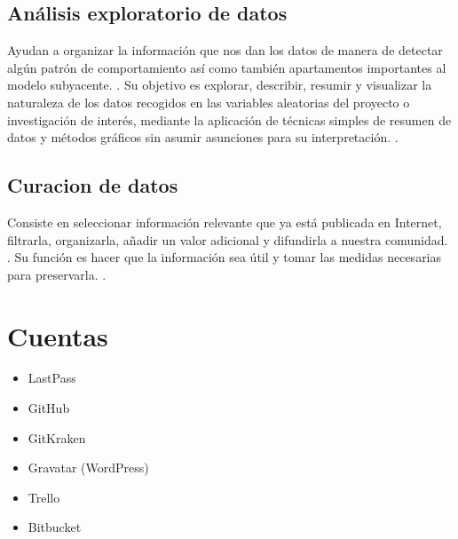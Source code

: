 \documentclass[12pt,letterpaper]{article}
\begin{document}
\subsection*{An\'alisis exploratorio de datos}
Ayudan a organizar la informaci\'on que nos dan los datos de manera de detectar alg\'un patr\'on de comportamiento as\'i como tambi\'en apartamentos importantes al modelo subyacente.
\cite[(Orellana, L. s.f.)]{ref12}.
Su objetivo es explorar, describir, resumir y visualizar la naturaleza de los datos recogidos en las variables aleatorias del proyecto o investigaci\'on de inter\'es, mediante la aplicaci\'on de t\'ecnicas simples de resumen de datos y m\'etodos gr\'aficos sin asumir asunciones para su interpretaci\'on.
\cite[(Helix Bios. s.f.)]{ref13}.

\subsection*{Curacion de datos}
Consiste en seleccionar informaci\'on relevante que ya est\'a publicada en Internet, filtrarla, organizarla, añadir un valor adicional y difundirla a nuestra comunidad.
\cite[(Duro, S. 2017)]{ref14}.
Su funci\'on es hacer que la informaci\'on sea \'util y tomar las medidas necesarias para preservarla.
\cite[(It User. 2020)]{ref15}.

\section{Cuentas}
\begin{itemize}
\item LastPass
\item GitHub
\item GitKraken
\item Gravatar (WordPress)
\item Trello
\item Bitbucket
\end{itemize}
\end{document}

